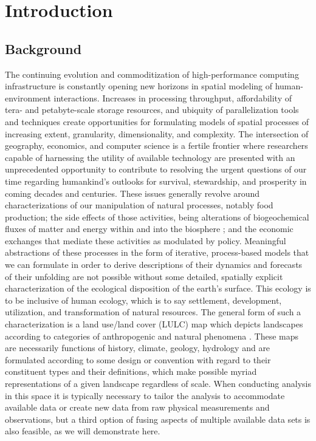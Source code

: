 
\chapter{Introduction}
\label{cha:introduction}

\section{Background}
\label{sec:background}

The continuing evolution and commoditization of high-performance
computing infrastructure is constantly opening new horizons in spatial
modeling of human-environment interactions.  Increases in
processing throughput, affordability of tera- and petabyte-scale
storage resources, and ubiquity of parallelization tools and
techniques create opportunities for formulating models of spatial
processes of increasing extent, granularity, dimensionality, and
complexity.  The intersection of geography, economics, and computer
science is a fertile frontier where researchers capable of harnessing
the utility of available technology are presented with an
unprecedented opportunity to contribute to resolving the urgent
questions of our time regarding humankind's outlooks for survival,
stewardship, and prosperity in coming decades and centuries.  These
issues generally revolve around characterizations of our manipulation
of natural processes, notably food production; the side effects of
those activities, being alterations of biogeochemical fluxes of matter
and energy within and into the biosphere \citep{Sellers1997}; and the
economic exchanges that mediate these activities as modulated by
policy.  Meaningful abstractions of these processes in the form of
iterative, process-based models that we can formulate in order to
derive descriptions of their dynamics and forecasts of their unfolding
are not possible without some detailed, spatially explicit
characterization of the ecological disposition of the earth's surface.
This ecology is to be inclusive of human ecology, which is to say
settlement, development, utilization, and transformation of natural
resources.  The general form of such a characterization is a land
use\slash land cover (LULC) map which depicts landscapes according to
categories of anthropogenic and natural phenomena \citep{Fisher2005a}.
These maps are necessarily functions of history, climate, geology,
hydrology and are formulated according to some design or convention
with regard to their constituent types and their definitions, which
make possible myriad representations of a given landscape regardless
of scale.  When conducting analysis in this space it is typically
necessary to tailor the analysis to accommodate available data or
create new data from raw physical measurements and observations, but a
third option of fusing aspects of multiple available data sets is also
feasible, as we will demonstrate here.

